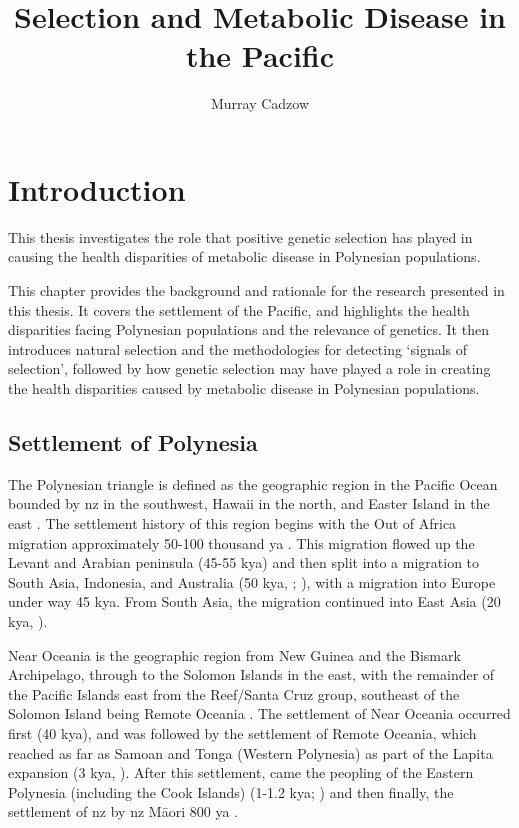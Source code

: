 \documentclass[twoside,openright]{report}
\title{Selection and Metabolic Disease in the Pacific}
\author{Murray Cadzow}
\date{}
\newcommand{\tex}[1]{#1}
\begin{document}
\maketitle

\newpage\null\thispagestyle{empty}\newpage


\address{710 Cumberland St, Dunedin, NZ}

\frontstuff

\chapter{Introduction}\label{introduction}

\glsresetall

This thesis investigates the role that positive genetic selection has
played in causing the health disparities of metabolic disease in
Polynesian populations.

This chapter provides the background and rationale for the research
presented in this thesis. It covers the settlement of the Pacific, and
highlights the health disparities facing Polynesian populations and the
relevance of genetics. It then introduces natural selection and the
methodologies for detecting `signals of selection', followed by how
genetic selection may have played a role in creating the health
disparities caused by metabolic disease in Polynesian populations.

\section{Settlement of Polynesia}\label{settlement-of-polynesia}

The Polynesian triangle is defined as the geographic region in the
Pacific Ocean bounded by \Gls{nz} in the southwest, Hawaii in the north,
and Easter Island in the east \citep{Barcham2009}. The settlement
history of this region begins with the Out of Africa migration
approximately 50-100 thousand \gls{ya} \citep{Nielsen2017}. This
migration flowed up the Levant and Arabian peninsula (45-55 k\gls{ya})
and then split into a migration to South Asia, Indonesia, and Australia
(50 k\gls{ya}, \citet{Kivisild1999}; \citet{Quintana-Murci1999}), with a
migration into Europe under way 45 k\gls{ya}. From South Asia, the
migration continued into East Asia (20 k\gls{ya}, \citet{Groucutt2015}).

Near Oceania is the geographic region from New Guinea and the Bismark
Archipelago, through to the Solomon Islands in the east, with the
remainder of the Pacific Islands east from the Reef/Santa Cruz group,
southeast of the Solomon Island being Remote Oceania
\citep{Matisoo-Smith2018}. The settlement of Near Oceania occurred first
(40 k\gls{ya}), and was followed by the settlement of Remote Oceania,
which reached as far as Samoan and Tonga (Western Polynesia) as part of
the Lapita expansion (3 k\gls{ya}, \citep{Matisoo-Smith2015, Skoglund2016}). After this settlement, came the peopling of the
Eastern Polynesia (including the Cook Islands) (1-1.2 k\gls{ya};
\citet{Wilmshurst2011}) and then finally, the settlement of \glsdesc{nz}
by \gls{nz} M\tex{\={a}}ori 800 \gls{ya}
\citep{Duggan2014, Matisoo-Smith2015}.
\end{document}
